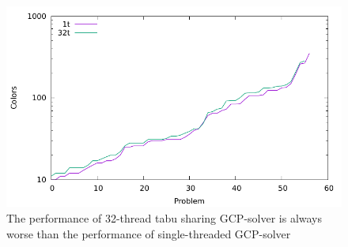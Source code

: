 \documentclass[12pt,a4paper,twoside]{scrartcl}
\numberwithin{equation}{section}
\begin{document}
\begin{figure}[h!]
\centering
  \includegraphics[scale = 1]{Experiments/E7/caclog.pdf}
      \caption{The performance of 32-thread tabu sharing GCP-solver is always worse than the performance of single-threaded GCP-solver}
\end{figure} 
\end{document}
